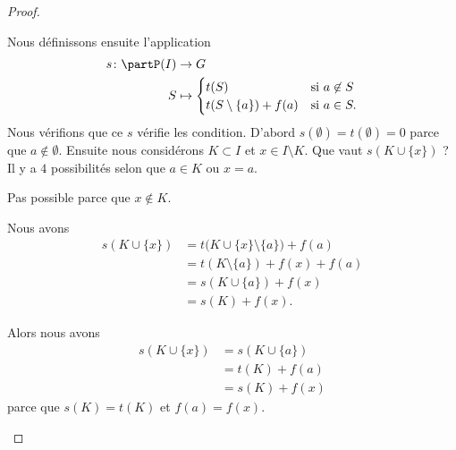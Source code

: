\begin{proof}
\begin{subproof}
		Nous définissons ensuite l'application
		\begin{equation}
			\begin{aligned}
				s\colon \partP(I) & \to G                                                     \\
				S                 & \mapsto \begin{cases}
					                            t(S)                      & \text{si } a\not\in S \\
					                            t(S\setminus\{ a \})+f(a) & \text{si } a\in S.
				                            \end{cases}
			\end{aligned}
		\end{equation}
		Nous vérifions que ce \( s\) vérifie les condition. D'abord \( s(\emptyset)=t(\emptyset)=0\) parce que \( a\not\in\emptyset\). Ensuite nous considérons \( K\subset I\) et \( x\in I\setminus K\). Que vaut \( s(K\cup\{ x \})\) ? Il y a \( 4\) possibilités selon que \( a\in K\) ou \( x=a\).

		\begin{subproof}
			\spitem[Si \( a\in K\) et \( x=a\)]
			Pas possible parce que \( x\not\in K\).

			\spitem[Si \( a\in K\) et \( x\neq a\)]
			Nous avons
			\begin{subequations}
				\begin{align}
					s(K\cup\{ x \}) & =t\big( K\cup\{ x \}\setminus\{ a \} \big)+f(a) \\
					                & =t(K\setminus\{ a \})+f(x)+f(a)                 \\
					                & =s(K\cup\{ a \})+f(x)                           \\
					                & =s(K)+f(x).
				\end{align}
			\end{subequations}

			\spitem[Si \( a\not\in K\) et \( x=a\)]
			Alors nous avons
			\begin{subequations}
				\begin{align}
					s(K\cup \{ x \}) & =s(K\cup\{ a \}) \\
					                 & =t(K)+f(a)       \\
					                 & =s(K)+f(x)
				\end{align}
			\end{subequations}
			parce que \( s(K)=t(K)\) et \( f(a)=f(x)\).


\end{subproof}
\end{subproof}
\end{proof}
